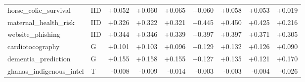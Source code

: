 \begin{longtable}{@{}p{3.95cm}lrrrrrrr@{}}
horse\_\allowbreak{}colic\_\allowbreak{}survival & IID & +0.052 & +0.060 & +0.065 & +0.060 & +0.058 & +0.053 & +0.019\\
maternal\_\allowbreak{}health\_\allowbreak{}risk & IID & +0.326 & +0.322 & +0.321 & +0.445 & +0.450 & +0.425 & +0.216\\
website\_\allowbreak{}phishing & IID & +0.344 & +0.346 & +0.339 & +0.397 & +0.397 & +0.371 & +0.305\\
cardiotocography & G & +0.101 & +0.103 & +0.096 & +0.129 & +0.132 & +0.126 & +0.090\\
dementia\_\allowbreak{}prediction & G & +0.155 & +0.158 & +0.155 & +0.127 & +0.135 & +0.121 & +0.170\\
ghanas\_\allowbreak{}indigenous\_\allowbreak{}intel & T & -0.008 & -0.009 & -0.014 & -0.003 & -0.003 & -0.004 & -0.026\\
\end{longtable}\endgroup
\begingroup\footnotesize\setlength{\tabcolsep}{3pt}\renewcommand{\arraystretch}{1.15}
\setlength\LTleft{0pt}\setlength\LTright{0pt}
